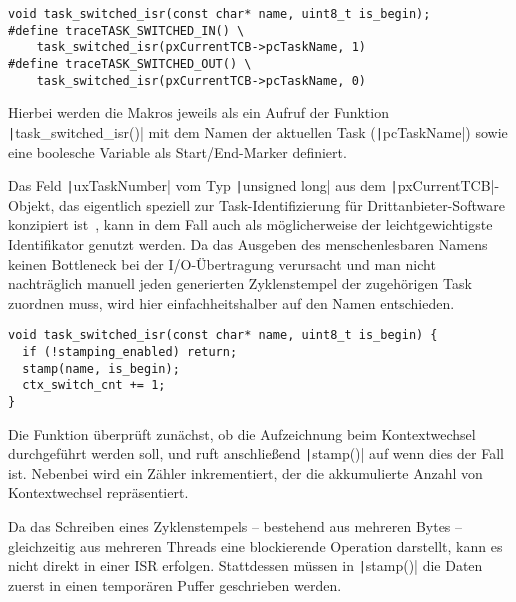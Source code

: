 \begin{code}
\begin{verbatim}
void task_switched_isr(const char* name, uint8_t is_begin);
#define traceTASK_SWITCHED_IN() \
    task_switched_isr(pxCurrentTCB->pcTaskName, 1)
#define traceTASK_SWITCHED_OUT() \
    task_switched_isr(pxCurrentTCB->pcTaskName, 0)
\end{verbatim}
\end{code}

Hierbei werden die Makros jeweils als ein Aufruf der Funktion
\texttt|task_switched_isr()| mit dem Namen der aktuellen Task
(\texttt|pcTaskName|) sowie eine boolesche Variable als
Start/End-Marker definiert.

Das Feld \texttt|uxTaskNumber| vom Typ \texttt|unsigned long|
aus dem \texttt|pxCurrentTCB|-Objekt, das eigentlich speziell zur
Task-Identifizierung für Drittanbieter-Software konzipiert
ist~\cite{freertos_task_c_410}, kann in dem Fall auch als möglicherweise der
leichtgewichtigste Identifikator genutzt werden. Da das Ausgeben des
menschenlesbaren Namens keinen Bottleneck bei der I/O-Übertragung verursacht und
man nicht nachträglich manuell jeden generierten Zyklenstempel der zugehörigen
Task zuordnen muss, wird hier einfachheitshalber auf den Namen entschieden.

\begin{code}
\begin{verbatim}
void task_switched_isr(const char* name, uint8_t is_begin) {
  if (!stamping_enabled) return;
  stamp(name, is_begin);
  ctx_switch_cnt += 1;
}
\end{verbatim}
\end{code}

Die Funktion überprüft zunächst, ob die Aufzeichnung beim Kontextwechsel
durchgeführt werden soll, und ruft anschließend \texttt|stamp()| auf
wenn dies der Fall ist. Nebenbei wird ein Zähler inkrementiert, der die
akkumulierte Anzahl von Kontextwechsel repräsentiert.


Da das Schreiben eines Zyklenstempels -- bestehend aus mehreren Bytes --
gleichzeitig aus mehreren Threads eine blockierende Operation darstellt, kann es
nicht direkt in einer ISR erfolgen. Stattdessen müssen in
\texttt|stamp()| die Daten zuerst in einen temporären Puffer
geschrieben werden.

